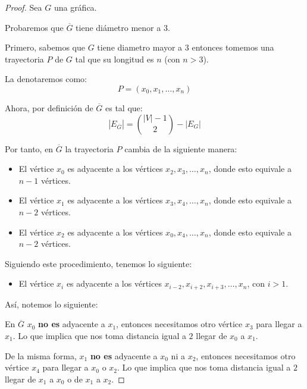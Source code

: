 \documentclass{article}
\begin{document}
\begin{enumerate}
\begin{enumerate}
        \begin{proof}
          Sea $G$ una gráfica.

          Probaremos que $\overline{G}$ tiene diámetro menor a $3$.

          Primero, sabemos que $G$ tiene diametro mayor a $3$ entonces tomemos una trayectoria $P$ de $G$ tal que su longitud es $n$ (con $n > 3$).

          La denotaremos como:
          $$P = (x_{0}, x_{1}, \dots, x_{n})$$

          Ahora, por definición de $\overline{G}$ es tal que:
          $$|E_{\overline{G}}| = \binom{|V| - 1}{2} - |E_{G}|$$

          Por tanto, en $\overline{G}$ la trayectoria $P$ cambia de la siguiente manera:
          \begin{itemize}
            \item El vértice $x_{0}$ es adyacente a los vértices $x_{2}, x_{3}, \dots, x_{n}$, donde esto equivale a $n - 1$ vértices.

            \item El vértice $x_{1}$ es adyacente a los vértices $x_{3}, x_{4}, \dots, x_{n}$, donde esto equivale a $n - 2$ vértices.

            \item El vértice $x_{2}$ es adyacente a los vértices $x_{0}, x_{4}, \dots, x_{n}$, donde esto equivale a $n - 2$ vértices.
          \end{itemize}

          Siguiendo este procedimiento, tenemos lo siguiente:
          \begin{itemize}
            \item El vértice $x_{i}$ es adyacente a los vértices $x_{i-2}, x_{i+2}, x_{i+3}, \dots, x_{n}$, con $i > 1$.
          \end{itemize}

          Así, notemos lo siguiente:

          En $\overline{G}$ $x_{0}$ \textbf{no es} adyacente a $x_{1}$, entonces necesitamos otro vértice $x_{3}$ para llegar a $x_{1}$. Lo que implica que nos toma distancia igual a $2$ llegar de $x_{0}$ a $x_{1}$.

          De la misma forma, $x_{1}$ \textbf{no es} adyacente a $x_{0}$ ni a $x_{2}$, entonces necesitamos otro vértice $x_{4}$ para llegar a $x_{0}$ o $x_{2}$. Lo que implica que nos toma distancia igual a $2$ llegar de $x_{1}$ a $x_{0}$ o de $x_{1}$ a $x_{2}$.


\end{proof}
\end{enumerate}
\end{enumerate}
\end{document}
